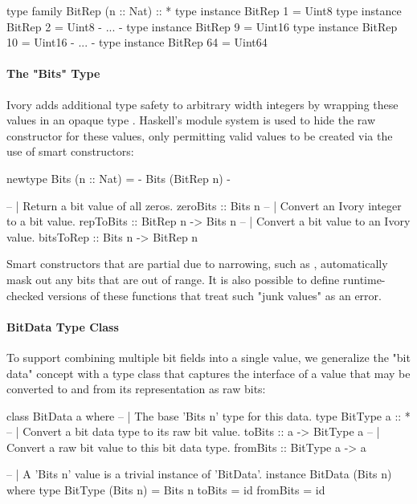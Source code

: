 \begin{code}
type family BitRep (n :: Nat) :: *
type instance BitRep 1 = Uint8
type instance BitRep 2 = Uint8
{- ... -}
type instance BitRep 9 = Uint16
type instance BitRep 10 = Uint16
{- ... -}
type instance BitRep 64 = Uint64
\end{code}

\paragraph{The "Bits" Type}
Ivory adds additional type safety to arbitrary width integers by
wrapping these values in an opaque type .
Haskell's module system is used to hide the raw constructor for
these values, only permitting valid values to be created via the
use of smart constructors:

\begin{code}
newtype Bits (n :: Nat) = {- Bits (BitRep n) -}

-- | Return a bit value of all zeros.
zeroBits :: Bits n
-- | Convert an Ivory integer to a bit value.
repToBits :: BitRep n -> Bits n
-- | Convert a bit value to an Ivory value.
bitsToRep :: Bits n -> BitRep n
\end{code}

Smart constructors that are partial due to narrowing,
such as , automatically mask out any bits that are
out of range. It is also possible to define runtime-checked versions
of these functions that treat such "junk values" as an error.

\paragraph{BitData Type Class}
To support combining multiple bit fields into a single value, we
generalize the "bit data" concept with a type class 
that captures the interface of a value that may be converted to
and from its representation as raw bits:

\begin{code}
class BitData a where
  -- | The base 'Bits n' type for this data.
  type BitType a :: *
  -- | Convert a bit data type to its raw bit value.
  toBits :: a -> BitType a
  -- | Convert a raw bit value to this bit data type.
  fromBits :: BitType a -> a

-- | A 'Bits n' value is a trivial instance of 'BitData'.
instance BitData (Bits n) where
  type BitType (Bits n) = Bits n
  toBits   = id
  fromBits = id
\end{code}

